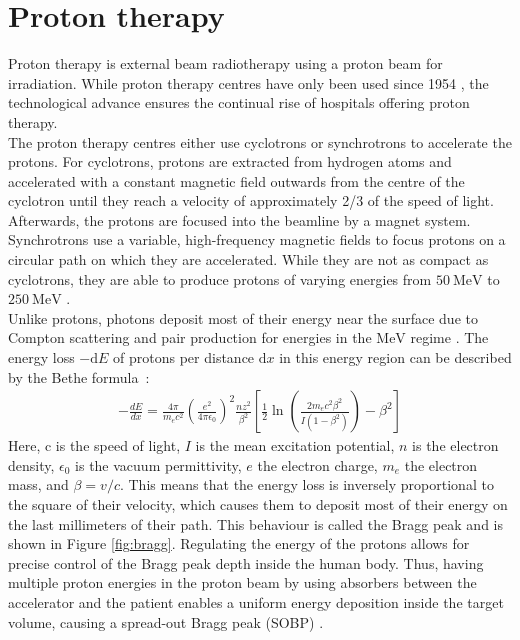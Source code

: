 \section{Proton therapy}
Proton therapy is external beam radiotherapy using a proton beam for irradiation.
While proton therapy centres have only been used since 1954 \cite{pct_history}, the technological
advance ensures the continual rise of hospitals offering proton therapy. \\
The proton therapy centres either use cyclotrons or synchrotrons to accelerate the protons.
For cyclotrons, protons are extracted from hydrogen atoms and accelerated with
a constant magnetic field outwards from the centre of the cyclotron until they reach a velocity of approximately 2/3 of the speed of light. Afterwards, the protons
are focused into the beamline by a magnet system. Synchrotrons use a variable,
high-frequency magnetic fields to focus protons on a circular path on which they are accelerated. While they
are not as compact as cyclotrons, they are able to produce protons of varying energies from $\SI{50}{\MeV}$ to $\SI{250}{\MeV}$ \cite{cyclo}. \\
Unlike protons, photons deposit most of their energy near the surface due to Compton scattering and pair production for energies
in the $\mathrm{MeV}$ regime \cite{compton}.
The energy loss $-\text{d}E$ of protons per distance $\text{d}x$ in this energy region can be described by the Bethe \mbox{formula \cite{bethe}}:
\begin{align}
  - \frac{dE}{dx} = \frac{4\pi}{m_e c^2}\left(\frac{e^2}{4\pi\epsilon_0}\right)^2\frac{nz^2}{\beta^2} \left[ \frac{1}{2} \ln{\left(\frac{2 m_e c^2 \beta^2}{I(1-\beta^2)}\right)} - \beta^2 \right]
\end{align}
Here, c is the speed of light,  $I$ is the mean excitation potential, $n$ is the electron density, $\epsilon_0$ is the vacuum permittivity, $e$ the electron charge,
$m_e$ the electron mass, and $\beta = v/c$.
This means that the energy loss is inversely proportional to the square of their velocity, which causes them to deposit most of their energy on the last millimeters of their path.
This behaviour is called the Bragg peak and is shown in Figure \ref{fig:bragg}.
Regulating the energy of the protons allows for precise control of the Bragg peak depth inside
the human body. Thus, having multiple proton energies in the proton beam by using absorbers between
the accelerator and the patient enables a uniform energy deposition inside the target volume, causing a spread-out Bragg peak (SOBP) \cite{sobp}.

